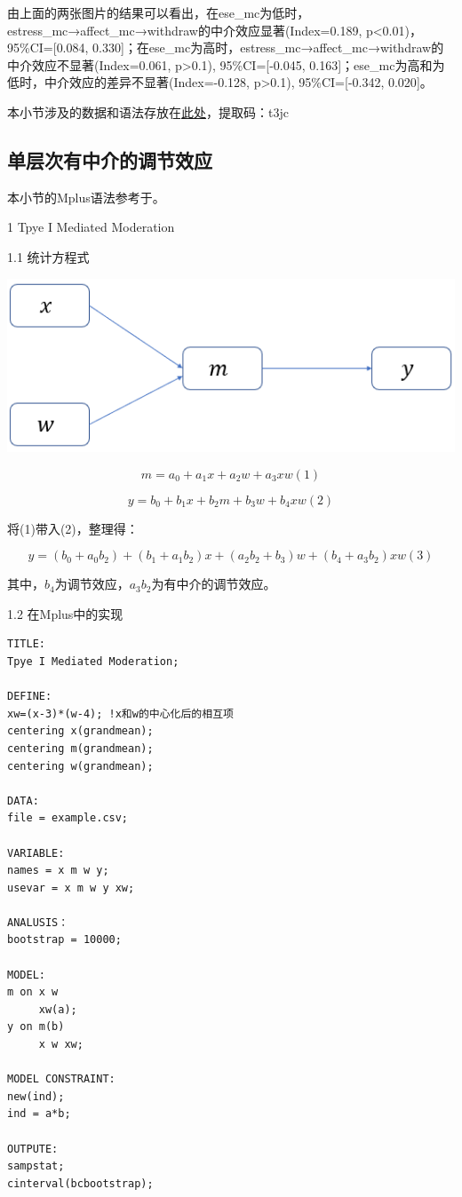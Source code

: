 \documentclass[
]{book}
\begin{document}
由上面的两张图片的结果可以看出，在ese\_mc为低时，estress\_mc→affect\_mc→withdraw的中介效应显著(Index=0.189, p\textless0.01)，95\%CI={[}0.084, 0.330{]}；在ese\_mc为高时，estress\_mc→affect\_mc→withdraw的中介效应不显著(Index=0.061, p\textgreater0.1), 95\%CI={[}-0.045, 0.163{]}；ese\_mc为高和为低时，中介效应的差异不显著(Index=-0.128, p\textgreater0.1), 95\%CI={[}-0.342, 0.020{]}。

本小节涉及的数据和语法存放在\href{https://pan.baidu.com/s/18CvdyI59eLxmkC-_8bDrcA}{此处}，提取码：t3jc

\hypertarget{memo}{%
\subsection{单层次有中介的调节效应}\label{memo}}

本小节的Mplus语法参考于\autocite{liudong2012:StochProc}。

1 Tpye I Mediated Moderation

1.1 统计方程式

\includegraphics{figs/1151.png}

\[
m=a_{0}+a_{1}x+a_{2}w+a_{3}xw(1)
\]

\[
y=b_{0}+b_{1}x+b_{2}m+b_{3}w+b_{4}xw(2)
\]

将(1)带入(2)，整理得：

\[
y=(b_{0}+a_{0}b_{2})+(b_{1}+a_{1}b_{2})x+(a_{2}b_{2}+b_{3})w+(b_{4}+a_{3}b_{2})xw(3)
\]

其中，\(b_{4}\)为调节效应，\(a_{3}b_{2}\)为有中介的调节效应。

1.2 在Mplus中的实现

\begin{verbatim}
TITLE:
Tpye I Mediated Moderation;

DEFINE:
xw=(x-3)*(w-4); !x和w的中心化后的相互项 
centering x(grandmean); 
centering m(grandmean); 
centering w(grandmean); 

DATA:
file = example.csv;

VARIABLE:
names = x m w y;
usevar = x m w y xw;

ANALUSIS：
bootstrap = 10000;

MODEL:
m on x w
     xw(a);
y on m(b)
     x w xw;

MODEL CONSTRAINT:
new(ind);
ind = a*b;

OUTPUTE:
sampstat;
cinterval(bcbootstrap);
\end{verbatim}
\end{document}
